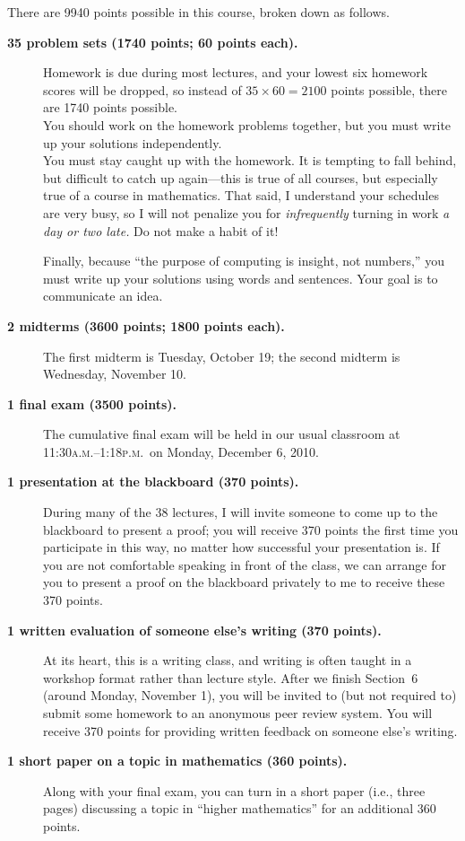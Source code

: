 \documentclass[12pt]{handout}
\newcommand{\peem}{\textsc{p.m.}}
\newcommand{\ayem}{\textsc{a.m.}}
\begin{document}
There are 9940 points possible in this course, broken down as
follows.
\begin{description}
\item[\textsf{\textbf{35 problem sets (1740 points; 60 points each).}}]  Homework is due during most lectures, and your lowest six homework scores will be dropped, so instead of $35 \times 60 = 2100$ points possible, there are 1740 points possible.\vspace{1ex}\\
      You should work on the homework problems together, but you must
      write up your solutions
      independently. \vspace{1ex}\\
      You must stay caught up with the homework.  It is tempting to
      fall behind, but difficult to catch up again---this is true of
      all courses, but especially true of a course in mathematics.
      That said, I understand your schedules are very busy, so I will
      not penalize you for \textit{infrequently} turning in work
      \textit{a day or two late.}  Do not make a habit of it!

Finally, because ``the purpose of computing is insight, not numbers,''
you must write up your solutions using words and sentences.  Your goal
is to communicate an idea.




\item[\textsf{\textbf{2 midterms (3600 points; 1800 points each).}}]
The first midterm is Tuesday, October 19; the second midterm is Wednesday, November 10.

\item[\textsf{\textbf{1 final exam (3500 points).}}]  The cumulative final exam will be held in our usual classroom at
11:30\ayem--1:18\peem\ on Monday, December 6, 2010.

\item[\textsf{\textbf{1 presentation at the blackboard (370 points).}}]  During many of the 38 lectures, I will invite someone to come up to the blackboard to present a proof; you will receive 370 points the first time you participate in this way, no matter how successful your presentation is.  If you are not comfortable speaking in front of the class, we can arrange for you to present a proof on the blackboard privately to me to receive these 370 points.

\item[\textsf{\textbf{1 written evaluation of someone else's writing (370 points).}}]  At its heart, this is a writing class, and writing is often taught in a workshop format rather than lecture style.  After we finish Section~6 (around Monday, November  1), you will be invited to (but not required to) submit some homework to an anonymous peer review system.  You will receive 370 points for providing written feedback on someone else's writing.

\item[\textsf{\textbf{1 short paper on a topic in mathematics (360 points).}}] Along with your final exam, you can turn in a short paper (i.e., three pages) discussing a topic in ``higher mathematics'' for an additional 360 points.

\end{description}

\vspace{1ex}
\end{document}
